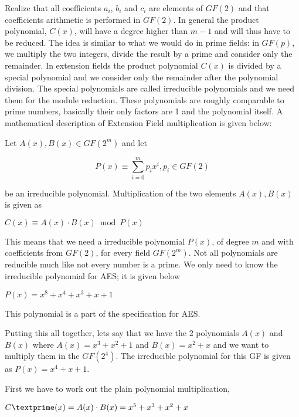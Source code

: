 Realize that all coefficients $a_i$, $b_i$ and $c_i$ are elements of $GF(2)$ and that coefficients arithmetic is performed in $GF(2)$. In general the product polynomial, $C(x)$, will have a degree higher than $m-1$ and will thus have to be reduced. The idea is similar to what we would do in prime fields: in $GF(p)$, we multiply  the two integers, divide the result by a prime and consider only the remainder. In extension fields the product polynomial $C(x)$ is divided by a special polynomial and we consider only the remainder after the polynomial division. The special polynomials are called irreducible polynomials and we need them for the module reduction. These polynomials are roughly comparable to prime numbers, basically their only factors are 1 and the polynomial itself. A mathematical description of Extension Field multiplication is given below:

Let $A(x), B(x) \in GF(2^m)$ and let 

\begin{center}
$$ P(x) \equiv \sum_{i=0}^{m} p_ix^i, p_i \in GF(2) $$
\end{center}

be an irreducible polynomial. Multiplication of the two elements $A(x), B(x)$ is given as

\begin{center}
$C(x) \equiv A(x) \cdot B(x) \bmod P(x)$
\end{center}

This means that we need a irreducible polynomial $P(x)$, of degree $m$ and with coefficients from $GF(2)$, for every field $GF(2^m)$. Not all polynomials are reducible much like not every number is a prime. We only need to know the irreducible polynomial for AES; it is given below

\begin{center}
$P(x) = x^8 + x^4 + x^3 + x + 1$
\end{center}

This polynomial is a part of the specification for AES. 

Putting this all together, lets say that we have the 2 polynomials $A(x)$ and $B(x)$ where $A(x) = x^3 + x^2 + 1$ and $B(x) = x^2 + x$ and we want to multiply them in the $GF(2^4)$. The irreducible polynomial for this GF is given as $P(x) = x^4 + x + 1$.

First we have to work out the plain polynomial multiplication,

\begin{center}
$C\textprime(x) = A(x) \cdot B(x) = x^5 + x^3 + x^2 + x $
\end{center}

